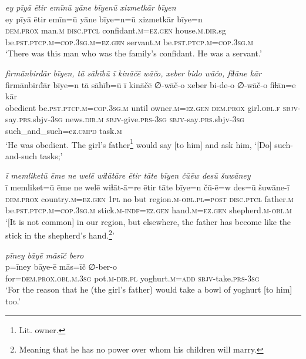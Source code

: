 \ea \label{RE.16}
\textit{ey pīyā ētir emīnū yāne bīyenū xizmetkār bīyen} \\ 
\gll ey pīyā ētir emīn=ū yāne bīye=n=ū xizmetkār bīye=n \\ 
 \textsc{dem.prox} man\textsc{.m} \textsc{disc.ptcl} confidant\textsc{.m}\textsc{=ez.gen} house\textsc{.m}\textsc{.dir}.sg be\textsc{.pst}\textsc{.ptcp}\textsc{.m}\textsc{=cop}\textsc{.3sg}\textsc{.m}\textsc{=ez.gen} servant\textsc{.m} be\textsc{.pst}\textsc{.ptcp}\textsc{.m}\textsc{=cop}\textsc{.3sg}\textsc{.m} \\ 
\glt `There was this man who was the family’s confidant. He was a servant.'
\z 
 
\ea \label{RE.18}
\textit{firmānbirđār bīyen, tā sāhībū ī kināčē wāčo, xeber bido wāčo, fiɫāne kār} \\ 
\gll firmānbirđār bīye=n tā sāhīb=ū ī kināčē ∅-wāč-o xeber bi-de-o ∅-wāč-o fiɫān=e kār \\ 
 obedient be\textsc{.pst}\textsc{.ptcp}\textsc{.m}\textsc{=cop}\textsc{.3sg}\textsc{.m} until owner\textsc{.m}\textsc{=ez.gen} \textsc{dem.prox} girl\textsc{.obl}\textsc{.f} \textsc{sbjv-}say\textsc{.prs}.sbjv\textsc{-3sg} news\textsc{.dir}\textsc{.m} \textsc{sbjv-}give\textsc{.prs}\textsc{-3sg} \textsc{sbjv-}say\textsc{.prs}.sbjv\textsc{-3sg} such\_and\_such=ez\textsc{.cmpd} task\textsc{.m} \\ 
\glt `He was obedient. The girl’s father\footnote{Lit. owner.} would say [to him] and ask him, ‘[Do] such-and-such tasks;'
\z 
 
\ea \label{RE.41}
\textit{ī memliketū ēme ne welē wiɫātāre ētir tāte bīyen čūēw desū šuwāney} \\ 
\gll ī memliket=ū ēme ne welē wiɫāt-ā=re ētir tāte bīye=n čū-ē=w des=ū šuwāne-ī \\ 
 \textsc{dem.prox} country\textsc{.m}\textsc{=ez.gen} \textsc{1pl} no but region\textsc{.m}\textsc{-obl}\textsc{.pl}\textsc{=\textsc{post}} \textsc{disc.ptcl} father\textsc{.m} be\textsc{.pst}\textsc{.ptcp}\textsc{.m}\textsc{=cop}\textsc{.3sg}\textsc{.m} stick\textsc{.m}\textsc{-indf}\textsc{=ez.gen} hand\textsc{.m}\textsc{=ez.gen} shepherd\textsc{.m}\textsc{-obl}\textsc{.m} \\ 
\glt `[It is not common] in our region, but elsewhere, the father has become like the stick in the shepherd’s hand.\footnote{Meaning that he has no power over whom his children will marry.}'
\z 
 
\ea \label{RE.52}
\textit{pīney bāyē māsīč bero} \\ 
\gll p=īney bāye-ē mās=īč ∅-ber-o \\ 
 for=\textsc{dem.prox}\textsc{.obl}\textsc{.m}\textsc{.3sg} pot\textsc{.m}\textsc{-dir}\textsc{.pl} yoghurt\textsc{.m}\textsc{=add} \textsc{sbjv-}take\textsc{.prs}\textsc{-3sg} \\ 
\glt `For the reason that he (the girl’s father) would take a bowl of yoghurt [to him] too.'
\z 
 
